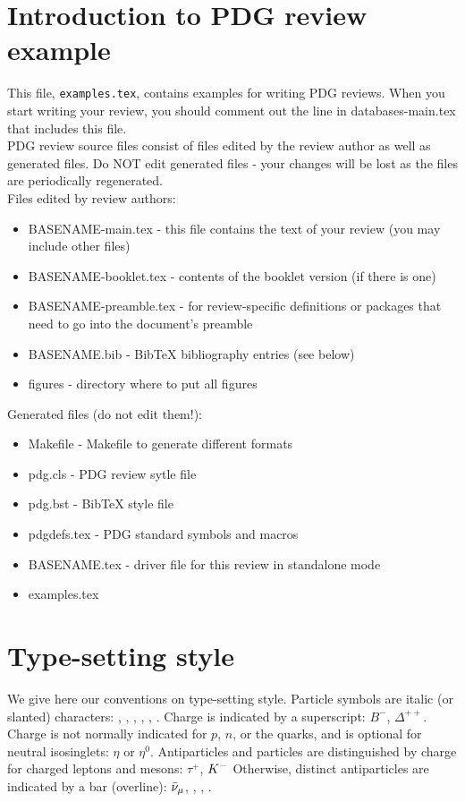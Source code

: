 

\section{Introduction to PDG review example}

This file, {\tt examples.tex}, contains examples for writing PDG
reviews. When you start writing your review, you should
comment out the line in databases-main.tex that includes this file.\\

PDG review source files consist of files edited by the review author as well as generated files. Do NOT edit generated files - your changes will be lost as the files are periodically regenerated.\\
Files edited by review authors:
\begin{itemize}
\item BASENAME-main.tex - this file contains the text of your review (you may include other files)
\item BASENAME-booklet.tex - contents of the booklet version (if there is one)
\item BASENAME-preamble.tex - for review-specific definitions or packages that need to go into the document's preamble
\item BASENAME.bib - BibTeX bibliography entries (see below)
\item figures - directory where to put all figures
\end{itemize}
Generated files (do not edit them!):
\begin{itemize}
\item Makefile - Makefile to generate different formats
\item pdg.cls - PDG review sytle file
\item pdg.bst - BibTeX style file
\item pdgdefs.tex - PDG standard symbols and macros
\item BASENAME.tex - driver file for this review in standalone mode
\item examples.tex
\end{itemize}


\section{Type-setting style}
We give here our conventions on type-setting style. Particle symbols are italic (or slanted) characters: \en, \pbar, \Lb, \pizero, \Klong, \Dstar. Charge is indicated by a superscript: $B^{-}$, $\Delta^{++}$. Charge is not normally indicated for $p$, $n$, or the quarks, and is optional for neutral isosinglets: $\eta$ or $\eta^{0}$. Antiparticles and particles are distinguished by charge for
charged leptons and mesons: $\tau^{+}$, $K^{-}$ Otherwise, distinct antiparticles are indicated by a bar (overline): $\bar{\nu}_{\mu}$, \tbar, \pbar, \Kzerobar.



